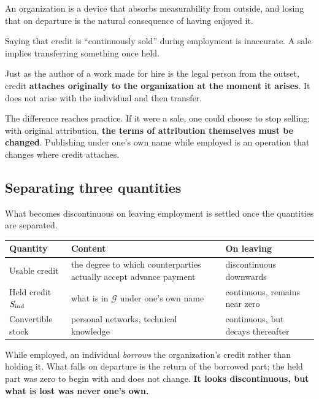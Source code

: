 An organization is a device that absorbs measurability from outside, and losing that on
departure is the natural consequence of having enjoyed it.

\begin{remark}
Saying that credit is ``continuously sold'' during employment is inaccurate. A sale implies
transferring something once held.

Just as the author of a work made for hire is the legal person from the outset, credit
\textbf{attaches originally to the organization at the moment it arises}. It does not arise
with the individual and then transfer.

The difference reaches practice. If it were a sale, one could choose to stop selling; with
original attribution, \textbf{the terms of attribution themselves must be changed}.
Publishing under one's own name while employed is an operation that changes where credit
attaches.
\end{remark}

\subsection{Separating three quantities}

What becomes discontinuous on leaving employment is settled once the quantities are
separated.

\begin{center}
\begin{tabularx}{\textwidth}{@{}lXl@{}}
\toprule
Quantity & Content & On leaving \\
\midrule
Usable credit & the degree to which counterparties actually accept advance payment & discontinuous downwards \\
Held credit $S_{\rm ind}$ & what is in $\mathcal{G}$ under one's own name & continuous, remains near zero \\
Convertible stock & personal networks, technical knowledge & continuous, but decays thereafter \\
\bottomrule
\end{tabularx}
\label{tab:solo-credit-decomposition}
\end{center}

While employed, an individual \emph{borrows} the organization's credit rather than holding
it. What falls on departure is the return of the borrowed part; the held part was zero to
begin with and does not change.
\textbf{It looks discontinuous, but what is lost was never one's own.}

